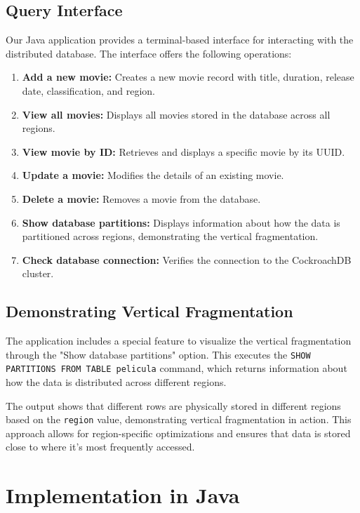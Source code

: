 \documentclass[twoside]{article}
\begin{document}
\subsection{Query Interface}

Our Java application provides a terminal-based interface for interacting with the distributed database. The interface offers the following operations:

\begin{enumerate}
  \item \textbf{Add a new movie:} Creates a new movie record with title, duration, release date, classification, and region.
  \item \textbf{View all movies:} Displays all movies stored in the database across all regions.
  \item \textbf{View movie by ID:} Retrieves and displays a specific movie by its UUID.
  \item \textbf{Update a movie:} Modifies the details of an existing movie.
  \item \textbf{Delete a movie:} Removes a movie from the database.
  \item \textbf{Show database partitions:} Displays information about how the data is partitioned across regions, demonstrating the vertical fragmentation.
  \item \textbf{Check database connection:} Verifies the connection to the CockroachDB cluster.
\end{enumerate}

\subsection{Demonstrating Vertical Fragmentation}

The application includes a special feature to visualize the vertical fragmentation through the "Show database partitions" option. This executes the \texttt{SHOW PARTITIONS FROM TABLE pelicula} command, which returns information about how the data is distributed across different regions.

The output shows that different rows are physically stored in different regions based on the \texttt{region} value, demonstrating vertical fragmentation in action. This approach allows for region-specific optimizations and ensures that data is stored close to where it's most frequently accessed.

\section{Implementation in Java}
\end{document}

